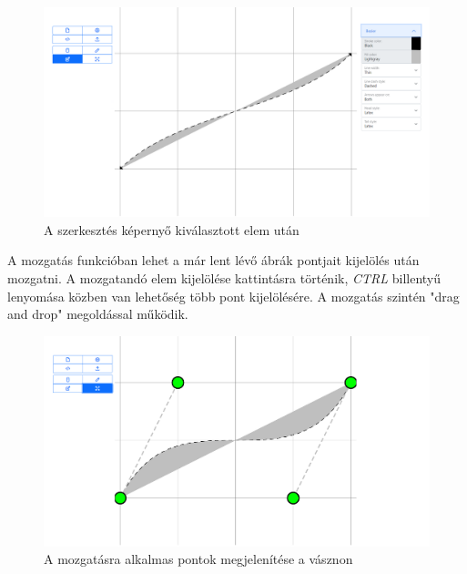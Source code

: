 \begin{figure}[!h]
	\label{fig:edit}
	\includegraphics[width=\textwidth]{images/editor_edit.png}
	\caption{A szerkesztés képernyő kiválasztott elem után}
\end{figure}


A mozgatás funkcióban lehet a már lent lévő ábrák pontjait kijelölés után mozgatni. A mozgatandó elem kijelölése kattintásra történik, \textit{CTRL} billentyű lenyomása közben van lehetőség több pont kijelölésére. A mozgatás szintén "drag and drop" megoldással működik.

\begin{figure}[!h]
	\label{fig:move}
	\includegraphics[width=\textwidth]{images/editor_move.png}
	\caption{A mozgatásra alkalmas pontok megjelenítése a vásznon}
\end{figure}



